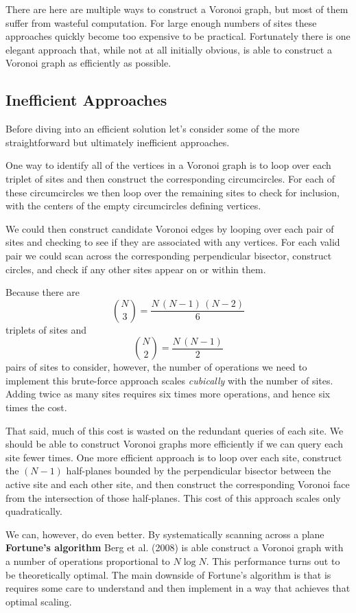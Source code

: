 \documentclass[
  letterpaper,
  DIV=11,
  numbers=noendperiod]{scrartcl}
\begin{document}
There are here are multiple ways to construct a Voronoi graph, but most
of them suffer from wasteful computation. For large enough numbers of
sites these approaches quickly become too expensive to be practical.
Fortunately there is one elegant approach that, while not at all
initially obvious, is able to construct a Voronoi graph as efficiently
as possible.

\subsection{Inefficient Approaches}\label{inefficient-approaches}

Before diving into an efficient solution let's consider some of the more
straightforward but ultimately inefficient approaches.

One way to identify all of the vertices in a Voronoi graph is to loop
over each triplet of sites and then construct the corresponding
circumcircles. For each of these circumcircles we then loop over the
remaining sites to check for inclusion, with the centers of the empty
circumcircles defining vertices.

We could then construct candidate Voronoi edges by looping over each
pair of sites and checking to see if they are associated with any
vertices. For each valid pair we could scan across the corresponding
perpendicular bisector, construct circles, and check if any other sites
appear on or within them.

Because there are \[
{ N \choose 3 }
=
\frac{ N \, (N - 1) \, (N - 2) }{ 6 }
\] triplets of sites and \[
{ N \choose 2 }
=
\frac{ N \, (N - 1) }{ 2 }
\] pairs of sites to consider, however, the number of operations we need
to implement this brute-force approach scales \emph{cubically} with the
number of sites. Adding twice as many sites requires six times more
operations, and hence six times the cost.

That said, much of this cost is wasted on the redundant queries of each
site. We should be able to construct Voronoi graphs more efficiently if
we can query each site fewer times. One more efficient approach is to
loop over each site, construct the \((N - 1)\) half-planes bounded by
the perpendicular bisector between the active site and each other site,
and then construct the corresponding Voronoi face from the intersection
of those half-planes. This cost of this approach scales only
quadratically.

We can, however, do even better. By systematically scanning across a
plane \textbf{Fortune's algorithm} Berg et al. (2008) is able construct
a Voronoi graph with a number of operations proportional to
\(N \log N\). This performance turns out to be theoretically optimal.
The main downside of Fortune's algorithm is that is requires some care
to understand and then implement in a way that achieves that optimal
scaling.
\end{document}
